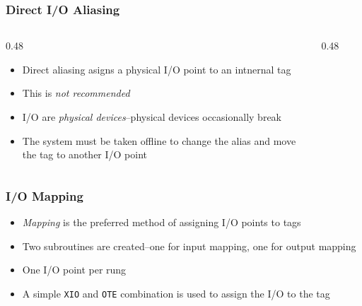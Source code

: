 \begin{frame}
    \frametitle{Direct I/O Aliasing}

    \begin{columns}
        \begin{column}{0.48\linewidth}
            \begin{itemize}
                \item Direct aliasing asigns a physical I/O point to an intnernal tag
                \item This is \emph{not recommended}
                \item I/O are \emph{physical devices}--physical devices occasionally break
                \item The system must be taken offline to change the alias and move the tag to another I/O point
            \end{itemize}
        \end{column}
        \begin{column}{0.48\linewidth}
            \begin{figure}
                \centering
                \resizebox{\linewidth}{!}{
                    
                }
            \end{figure}
        \end{column}
    \end{columns}
\end{frame}

\begin{frame}
    \frametitle{I/O Mapping}

    \begin{itemize}
        \item \emph{Mapping} is the preferred method of assigning I/O points to tags
        \item Two subroutines are created--one for input mapping, one for output mapping
        \item One I/O point per rung
        \item A simple \texttt{XIO} and \texttt{OTE} combination is used to assign the I/O to the tag
    \end{itemize}
\end{frame}

